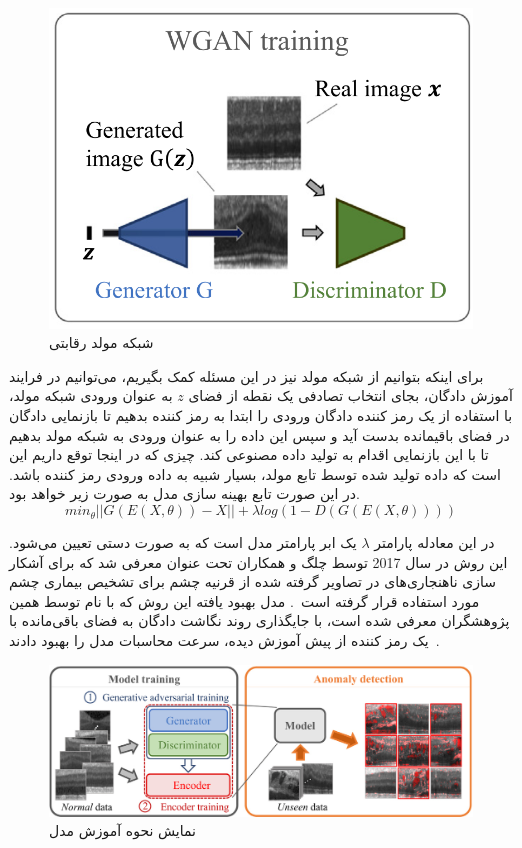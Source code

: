\documentclass[12pt,a4paper]{report}
\theoremstyle{definition}
\theoremstyle{definition}
\begin{document}
\begin{figure}[!h]
	\begin{center}
		\includegraphics[width=0.7\linewidth]{./images/figures/gan.png}
	\end{center}
	\caption{شبکه مولد رقابتی}
	\label{fig:vae}
	\centering
\end{figure}

برای اینکه بتوانیم از شبکه مولد نیز در این مسئله کمک بگیریم، می‌توانیم در فرایند آموزش دادگان، بجای انتخاب تصادفی یک نقطه از فضای $z$ به عنوان ورودی شبکه مولد، با استفاده از یک رمز کننده دادگان ورودی را ابتدا به رمز کننده بدهیم تا بازنمایی دادگان در فضای باقیمانده بدست آید و سپس این داده را به عنوان ورودی به شبکه مولد بدهیم تا با این بازنمایی اقدام به تولید داده مصنوعی کند. چیزی که در اینجا توقع داریم این است که داده تولید شده توسط تابع مولد، بسیار شبیه به داده ورودی رمز کننده باشد. در این صورت تابع بهینه سازی مدل به صورت زیر خواهد بود.
\begin{equation}
	min_\theta ||G(E(X, \theta)) - X|| + \lambda log(1-D(G(E(X, \theta))))
\end{equation}

در این معادله پارامتر $\lambda$ یک ابر پارامتر مدل است که به صورت دستی تعیین می‌شود. این روش در سال 2017 توسط چلگ و همکاران تحت عنوان  معرفی شد که برای آشکار سازی ناهنجاری‌های در تصاویر  گرفته شده از قرنیه چشم برای تشخیص بیماری چشم مورد استفاده قرار گرفته است~\cite{10.1007/978-3-319-59050-9_12}. مدل بهبود یافته این روش که با نام  توسط همین پژوهشگران معرفی شده است، با جایگذاری روند نگاشت دادگان به فضای باقی‌مانده با یک رمز کننده از پیش آموزش دیده، سرعت محاسبات مدل را بهبود دادند~\cite{SCHLEGL201930}.
\begin{figure}[!h]
	\begin{center}
		\includegraphics[width=0.7\linewidth]{./images/figures/anogan.png}
	\end{center}
	\caption{نمایش نحوه آموزش مدل ~\cite{SCHLEGL201930}}
	\label{fig:vae}
	\centering
\end{figure}
\end{document}
